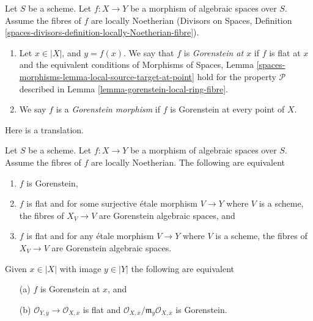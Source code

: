 \begin{definition}
\label{definition-gorenstein}
Let $S$ be a scheme.
Let $f : X \to Y$ be a morphism of algebraic spaces over $S$.
Assume the fibres of $f$ are locally Noetherian
(Divisors on Spaces, Definition
\ref{spaces-divisors-definition-locally-Noetherian-fibre}).
\begin{enumerate}
\item Let $x \in |X|$, and $y = f(x)$. We say that $f$ is
{\it Gorenstein at $x$} if $f$ is flat at $x$ and
the equivalent conditions of
Morphisms of Spaces, Lemma
\ref{spaces-morphisms-lemma-local-source-target-at-point}
hold for the property $\mathcal{P}$ described in
Lemma \ref{lemma-gorenstein-local-ring-fibre}.
\item We say $f$ is a {\it Gorenstein morphism} if $f$ is
Gorenstein at every point of $X$.
\end{enumerate}
\end{definition}

\noindent
Here is a translation.

\begin{lemma}
\label{lemma-gorenstein}
Let $S$ be a scheme. Let $f : X \to Y$ be a morphism of algebraic spaces
over $S$. Assume the fibres of $f$ are locally Noetherian.
The following are equivalent
\begin{enumerate}
\item $f$ is Gorenstein,
\item $f$ is flat and for some surjective \'etale morphism $V \to Y$
where $V$ is a scheme, the fibres of $X_V \to V$
are Gorenstein algebraic spaces, and
\item $f$ is flat and for any \'etale morphism $V \to Y$
where $V$ is a scheme, the fibres of $X_V \to V$
are Gorenstein algebraic spaces.
\end{enumerate}
Given $x \in |X|$ with image $y \in |Y|$ the following are
equivalent
\begin{enumerate}
\item[(a)] $f$ is Gorenstein at $x$, and
\item[(b)] $\mathcal{O}_{Y, \overline{y}} \to \mathcal{O}_{X, \overline{x}}$
is flat and
$\mathcal{O}_{X, \overline{x}}/
\mathfrak m_{\overline{y}}\mathcal{O}_{X, \overline{x}}$ is Gorenstein.
\end{enumerate}
\end{lemma}

